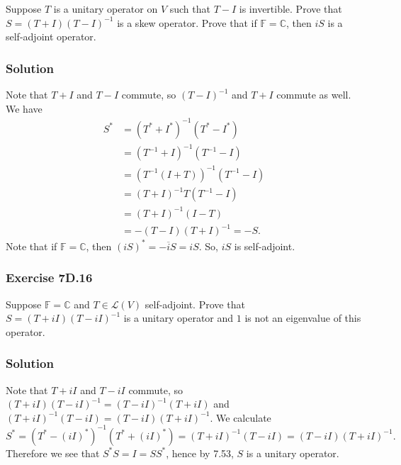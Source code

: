 Suppose $T$ is a unitary operator on $V$ such that $T - I$ is invertible.
Prove that $S = (T + I)(T - I)^{-1}$ is a skew operator.
Prove that if $\mathbb{F} = \mathbb{C}$, then $iS$ is a self-adjoint operator.


\subsubsection*{Solution}

Note that $T + I$ and $T - I$ commute, so $(T - I)^{-1}$ and $T + I$ commute as well.
We have
\begin{equation*}
    \begin{split}
        S^* &= (T^* + I^*)^{-1}(T^* - I^*) \\
            &= (T^{-1} + I)^{-1}(T^{-1} - I) \\
            &= (T^{-1}(I + T))^{-1}(T^{-1} - I) \\
            &= (T + I)^{-1} T(T^{-1} - I) \\
            &= (T + I)^{-1} (I - T) \\
            &= - (T - I)(T + I)^{-1} = -S.
    \end{split}
\end{equation*}
Note that if $\mathbb{F} = \mathbb{C}$, then $(iS)^* = -\overline{i}S = iS$.
So, $iS$ is self-adjoint.


\subsubsection*{Exercise 7D.16}

Suppose $\mathbb{F} = \mathbb{C}$ and $T \in \mathcal{L}(V)$ self-adjoint.
Prove that $S = (T + iI)(T - iI)^{-1}$ is a unitary operator and $1$ is not an eigenvalue of this operator.

\subsubsection*{Solution}

Note that $T + iI$ and $T - iI$ commute, so $(T + iI)(T - iI)^{-1} = (T - iI)^{-1}(T + iI)$ and $(T + iI)^{-1}(T - iI) = (T - iI)(T + iI)^{-1}$.
We calculate
\begin{equation*}
    S^*
        = (T^* - (iI)^*)^{-1} (T^* + (iI)^*)
        = (T + iI)^{-1} (T - iI)
        = (T - iI) (T + iI)^{-1}.
\end{equation*}
Therefore we see that $S^*S = I = SS^*$, hence by 7.53, $S$ is a unitary operator.

